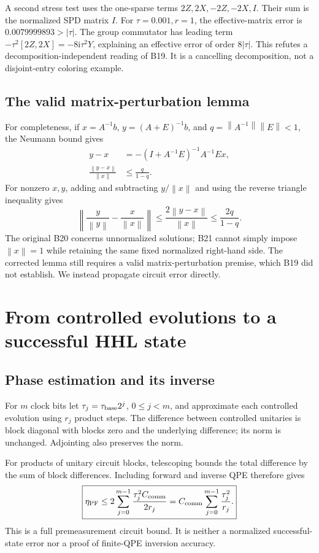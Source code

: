 \documentclass[11pt,a4paper]{article}
\newcommand{\norm}[1]{\left\lVert #1\right\rVert}
\newcommand{\C}{C_{\mathrm{comm}}}
\newcommand{\ip}{\mathrm{i}}
\begin{document}
A second stress test uses the one-sparse terms $2Z,2X,-2Z,-2X,I$. Their sum is the normalized SPD matrix $I$. For $\tau=0.001,r=1$, the effective-matrix error is $0.0079999893>|\tau|$. The group commutator has leading term $-\tau^2[2Z,2X]=-8\ip\tau^2Y$, explaining an effective error of order $8|\tau|$. This refutes a decomposition-independent reading of B19. It is a cancelling decomposition, not a disjoint-entry coloring example.

\subsection{The valid matrix-perturbation lemma}
For completeness, if $x=A^{-1}b$, $y=(A+E)^{-1}b$, and $q=\norm{A^{-1}}\norm E<1$, the Neumann bound gives
\begin{align}
 y-x&=-(I+A^{-1}E)^{-1}A^{-1}Ex,\\
 \frac{\norm{y-x}}{\norm x}&\leq\frac{q}{1-q}.
\end{align}
For nonzero $x,y$, adding and subtracting $y/\norm x$ and using the reverse triangle inequality gives
\begin{equation}\label{eq:normalize}
 \norm{\frac{y}{\norm y}-\frac{x}{\norm x}}
 \leq\frac{2\norm{y-x}}{\norm x}
 \leq\frac{2q}{1-q}.
\end{equation}
The original B20 concerns unnormalized solutions; B21 cannot simply impose $\norm x=1$ while retaining the same fixed normalized right-hand side. The corrected lemma still requires a valid matrix-perturbation premise, which B19 did not establish. We instead propagate circuit error directly.

\section{From controlled evolutions to a successful HHL state}
\subsection{Phase estimation and its inverse}
For $m$ clock bits let $\tau_j=\tau_{\rm base}2^j$, $0\leq j<m$, and approximate each controlled evolution using $r_j$ product steps. The difference between controlled unitaries is block diagonal with blocks zero and the underlying difference; its norm is unchanged. Adjointing also preserves the norm.

For products of unitary circuit blocks, telescoping bounds the total difference by the sum of block differences. Including forward and inverse QPE therefore gives
\begin{equation}\label{eq:circuit}
 \boxed{\eta_{\rm PF}\leq
 2\sum_{j=0}^{m-1}\frac{\tau_j^2\C}{2r_j}
 =\C\sum_{j=0}^{m-1}\frac{\tau_j^2}{r_j}.}
\end{equation}
This is a full premeasurement circuit bound. It is neither a normalized successful-state error nor a proof of finite-QPE inversion accuracy.
\end{document}
